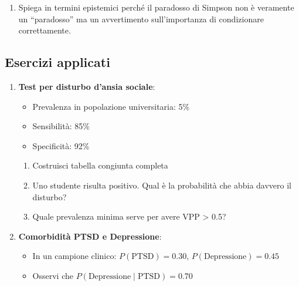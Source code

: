 \documentclass[
  italian,
  letterpaper,
  a4paper,
  11pt,
  open=any]{scrbook}
\providecommand{\tightlist}{%
  \setlength{\itemsep}{0pt}\setlength{\parskip}{0pt}}
\theoremstyle{plain}
\theoremstyle{definition}
\theoremstyle{definition}
\theoremstyle{remark}
\begin{document}
\begin{tcolorbox}
\begin{enumerate}
  \begin{enumerate}
  \def\labelenumii{\alph{enumii}.}
  \tightlist
  \item
    In ciascun gruppo, il farmaco è migliore?
  \item
    Calcola le proporzioni aggregate (tutti i pazienti insieme)
  \item
    Costruisci uno scenario dove l'aggregato inverte la tendenza
  \end{enumerate}
\item
  Spiega in termini epistemici perché il paradosso di Simpson non è
  veramente un ``paradosso'' ma un avvertimento sull'importanza di
  condizionare correttamente.
\end{enumerate}

\subsection*{Esercizi applicati}\label{esercizi-applicati}

\begin{enumerate}
\def\labelenumi{\arabic{enumi}.}
\setcounter{enumi}{19}
\tightlist
\item
  \textbf{Test per disturbo d'ansia sociale}:

  \begin{itemize}
  \tightlist
  \item
    Prevalenza in popolazione universitaria: 5\%
  \item
    Sensibilità: 85\%
  \item
    Specificità: 92\%
  \end{itemize}

  \begin{enumerate}
  \def\labelenumii{\alph{enumii}.}
  \tightlist
  \item
    Costruisci tabella congiunta completa
  \item
    Uno studente risulta positivo. Qual è la probabilità che abbia
    davvero il disturbo?
  \item
    Quale prevalenza minima serve per avere VPP \textgreater{} 0.5?
  \end{enumerate}
\item
  \textbf{Comorbidità PTSD e Depressione}:

  \begin{itemize}
  \tightlist
  \item
    In un campione clinico: \(P(\text{PTSD}) = 0.30\),
    \(P(\text{Depressione}) = 0.45\)
  \item
    Osservi che \(P(\text{Depressione} \mid \text{PTSD}) = 0.70\)
  \end{itemize}


\end{enumerate}
\end{tcolorbox}
\end{document}
